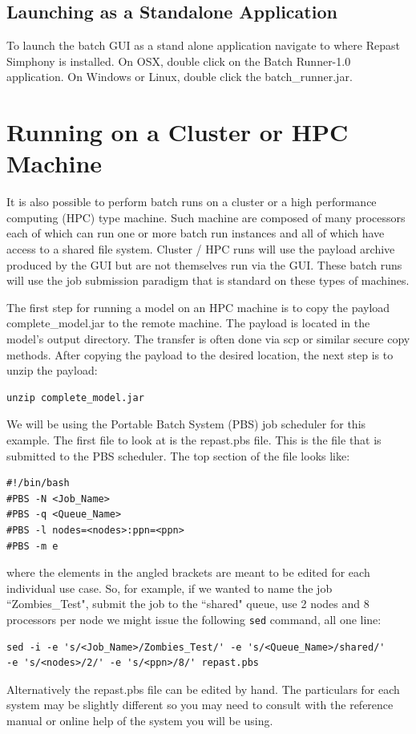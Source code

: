 \documentclass[11pt]{amsart}
\begin{document}
\subsection{Launching as a Standalone Application}
To launch the batch GUI as a stand alone application navigate to where Repast Simphony is installed. On OSX, double click on the Batch Runner-1.0 application. On Windows or Linux, double click the batch\_runner.jar. 
 
\section{Running on a Cluster or HPC Machine}

It is also possible to perform batch runs on a cluster or a high performance computing (HPC) type machine. Such machine are composed of many processors each of which can run one or more batch run instances and all of which have access to a shared file system. Cluster / HPC runs will use the payload archive produced by the GUI  but are not themselves run via the GUI. These batch runs will use the job submission paradigm that is standard on these types of machines.

The first step for running a model on an HPC machine is to copy the payload complete\_model.jar to the remote machine. The payload is located in the model's output directory. The transfer is often done via scp or similar secure copy methods. After copying the payload to the desired location, the next step is to unzip the payload:

\begin{verbatim}
unzip complete_model.jar
\end{verbatim}

We will be using the Portable Batch System (PBS) job scheduler for this example. The first file to look at is the repast.pbs file. This is the file that is submitted to the PBS scheduler. The top section of the file looks like:
\begin{verbatim}
#!/bin/bash
#PBS -N <Job_Name>
#PBS -q <Queue_Name>
#PBS -l nodes=<nodes>:ppn=<ppn>
#PBS -m e
\end{verbatim}

\noindent where the elements in the angled brackets are meant to be edited for each individual use case. So, for example, if we wanted to name the job ``Zombies\_Test", submit the job to the ``shared" queue,  use 2 nodes and 8 processors per node we might issue the following \texttt{sed} command, all one line:
\begin{verbatim}
sed -i -e 's/<Job_Name>/Zombies_Test/' -e 's/<Queue_Name>/shared/'
-e 's/<nodes>/2/' -e 's/<ppn>/8/' repast.pbs
\end{verbatim}
Alternatively the repast.pbs file can be edited by hand. The particulars for each system may be slightly different so you may need to consult with the reference manual or online help of the system you will be using.
\end{document}
